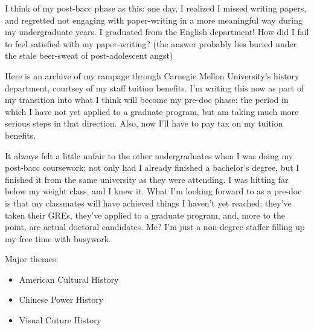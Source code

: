 I think of my post-bacc phase as this: one day, I realized I missed writing
papers, and regretted not engaging with paper-writing in a more meaningful way
during my undergraduate years. I graduated from the English department! How did
I fail to feel satisfied with my paper-writing? (the answer probably lies buried
under the stale beer-sweat of post-adolescent angst)

Here is an archive of my rampage through Carnegie Mellon University's history
department, courtsey of my staff tuition benefits. I'm writing this now as part
of my transition into what I think will become my pre-doc phase: the period in
which I have not yet applied to a graduate program, but am taking much more
serious steps in that direction. Also, now I'll have to pay tax on my tuition
benefits.

It always felt a little unfair to the other undergraduates when I was doing my
post-bacc coursework; not only had I already finished a bachelor's degree, but I
finished it from the same university as they were attending. I was hitting far
below my weight class, and I knew it. What I'm looking forward to as a pre-doc
is that my classmates will have achieved things I haven't yet reached: they've
taken their GREs, they've applied to a graduate program, and, more to the point,
are actual doctoral candidates. Me? I'm just a non-degree staffer filling up my
free time with busywork.

Major themes:
    \begin{itemize}
    \item American Cultural History
    \item Chinese Power History
    \item Visual Cuture History
    \end{itemize}
